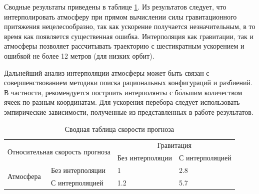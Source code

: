 Сводные результаты приведены в таблице \ref{tab:atmo_propag_acc}. Из результатов следует, что интерполировать атмосферу
при прямом вычислении силы гравитационного притяжения нецелесообразно, так как ускорение
получается незначительным, в то время как появляется существенная ошибка. Интерполяция
как гравитации, так и атмосферы позволяет рассчитывать траекторию с шестикратным ускорением и
ошибкой не более 12 метров (для низких орбит).

Дальнейший анализ интерполяции атмосферы может быть связан с совершенствованием методики
поиска рациональных конфигураций и разбиений. В частности, рекомендуется
построить интерполянты с б\`{о}льшим количеством ячеек по разным координатам. Для ускорения
перебора следует использовать эмпирические зависимости, полученные из представленных в работе
результатов.

\begin{table}[h!]
    \caption{Сводная таблица скорости прогноза}
    \centering
    \renewcommand{\arraystretch}{1.5}
    \begin{tabular}{|ll|ll|}
    \hline
    \multicolumn{2}{|l|}{\multirow{2}{*}{Относительная скорость прогноза}} & \multicolumn{2}{c|}{Гравитация}                         \\ \cline{3-4} 
    \multicolumn{2}{|l|}{}                                                 & \multicolumn{1}{c|}{Без интерполяции} & С интерполяцией \\ \hline
    \multicolumn{1}{|l|}{\multirow{2}{*}{Атмосфера}}   & Без интерполяции  & \multicolumn{1}{l|}{1}                & 2.8             \\ \cline{2-4} 
    \multicolumn{1}{|l|}{}                             & С интерполяцией   & \multicolumn{1}{l|}{1.2}              & 5.7             \\ \hline
    \end{tabular}
    \label{tab:atmo_propag_acc}
\end{table}
\clearpage